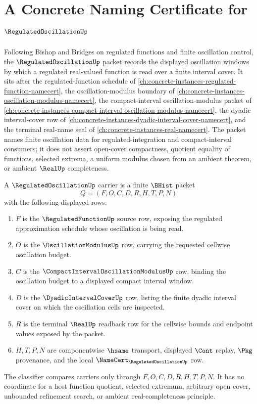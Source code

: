 \chapter{A Concrete Naming Certificate for $\RegulatedOscillationUp$}
\label{ch:concrete-instances-regulated-oscillation-namecert}

Following Bishop and Bridges on regulated functions and finite oscillation control, the $\RegulatedOscillationUp$ packet records the displayed oscillation windows by which a regulated real-valued function is read over a finite interval cover. It sits after the regulated-function schedule of \autoref{ch:concrete-instances-regulated-function-namecert}, the oscillation-modulus boundary of \autoref{ch:concrete-instances-oscillation-modulus-namecert}, the compact-interval oscillation-modulus packet of \autoref{ch:concrete-instances-compact-interval-oscillation-modulus-namecert}, the dyadic interval-cover row of \autoref{ch:concrete-instances-dyadic-interval-cover-namecert}, and the terminal real-name seal of \autoref{ch:concrete-instances-real-namecert}. The packet names finite oscillation data for regulated-integration and compact-interval consumers; it does not assert open-cover compactness, quotient equality of functions, selected extrema, a uniform modulus chosen from an ambient theorem, or ambient $\RealUp$ completeness.

\begin{definition}
\label{def:regulated-oscillation-carrier}
A $\RegulatedOscillationUp$ carrier is a finite $\BHist$ packet
$$
Q=(F,O,C,D,R,H,T,P,N)
$$
with the following displayed rows:
\begin{enumerate}
\item $F$ is the $\RegulatedFunctionUp$ source row, exposing the regulated approximation schedule whose oscillation is being read.
\item $O$ is the $\OscillationModulusUp$ row, carrying the requested cellwise oscillation budget.
\item $C$ is the $\CompactIntervalOscillationModulusUp$ row, binding the oscillation budget to a displayed compact interval window.
\item $D$ is the $\DyadicIntervalCoverUp$ row, listing the finite dyadic interval cover on which the oscillation cells are inspected.
\item $R$ is the terminal $\RealUp$ readback row for the cellwise bounds and endpoint values exposed by the packet.
\item $H,T,P,N$ are componentwise $\hsame$ transport, displayed $\Cont$ replay, $\Pkg$ provenance, and the local $\NameCert_{\RegulatedOscillationUp}$ row.
\end{enumerate}
The classifier compares carriers only through $F,O,C,D,R,H,T,P,N$. It has no coordinate for a host function quotient, selected extremum, arbitrary open cover, unbounded refinement search, or ambient real-completeness principle.
\end{definition}

